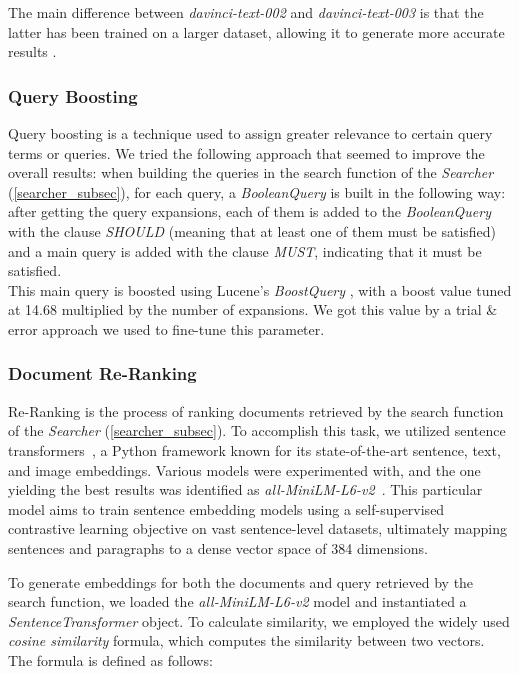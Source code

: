 The main difference between \textit{davinci-text-002} and \textit{davinci-text-003} is that the latter has been trained on a larger dataset, allowing it to generate more accurate results \cite{davincicomparison}.


\enlargethispage{2\baselineskip}
\subsubsection{Query Boosting}
Query boosting is a technique used to assign greater relevance to certain query terms or queries.\newline
We tried the following approach that seemed to improve the overall results: when building the queries in the search function of the \textit{Searcher} (\ref{searcher_subsec}), for each query, a \textit{BooleanQuery} \cite{lucenebooleanquery} is built in the following way: 
after getting the query expansions, each of them is added to the \textit{BooleanQuery} with the clause \textit{SHOULD} (meaning that at least one of them must be satisfied) and a main query is added with the clause \textit{MUST}, indicating that it must be satisfied. \\
This main query is boosted using Lucene's \textit{BoostQuery} \cite{luceneboostquery}, with a boost value tuned at 14.68 multiplied by the number of expansions. We got this value by a trial \& error approach we used to fine-tune this parameter.


\newpage
\enlargethispage{6\baselineskip}
\subsubsection{Document Re-Ranking}
Re-Ranking is the process of ranking documents retrieved by the search function of the \textit{Searcher} (\ref{searcher_subsec}). 
To accomplish this task, we utilized sentence transformers~\cite{sentence-transformers}, a Python framework known for its state-of-the-art sentence, text, and image embeddings. 
Various models were experimented with, and the one yielding the best results was identified as \textit{all-MiniLM-L6-v2}~\cite{huggingfaceallminilml6v2}. 
This particular model aims to train sentence embedding models using a self-supervised contrastive learning objective on vast sentence-level datasets, ultimately mapping sentences and paragraphs to a dense vector space of 384 dimensions.

To generate embeddings for both the documents and query retrieved by the search function, we loaded the \textit{all-MiniLM-L6-v2} model and instantiated a \textit{SentenceTransformer} object. 
To calculate similarity, we employed the widely used \textit{cosine similarity} formula, which computes the similarity between two vectors. The formula is defined as follows:


